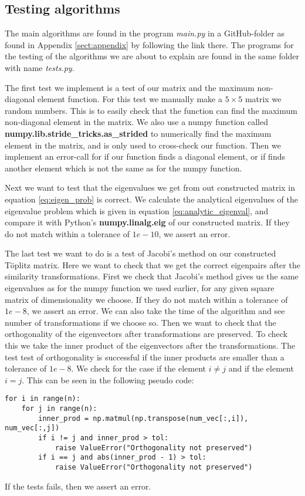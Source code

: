 \documentclass[12pt,a4paper,english]{article}
\begin{document}
\subsection{Testing algorithms}
\label{sect:testing}
The main algorithms are found in the program \textit{main.py} in a GitHub-folder as found in Appendix \ref{sect:appendix} by following the link there. The programs for the testing of the algorithms we are about to explain are found in the same folder with name \textit{tests.py}.

The first test we implement is a test of our matrix and the maximum non-diagonal element function. For this test we manually make a $5\times5$ matrix we random numbers. This is to easily check that the function can find the maximum non-diagonal element in the matrix. We also use a numpy function called \textbf{numpy.lib.stride\_tricks.as\_strided} to numerically find the maximum element in the matrix, and is only used to cross-check our function. Then we implement an error-call for if our function finds a diagonal element, or if finds another element which is not the same as for the numpy function.

Next we want to test that the eigenvalues we get from out constructed matrix in equation \ref{eq:eigen_prob} is correct. We calculate the analytical eigenvalues of the eigenvalue problem which is given in equation \ref{eq:analytic_eigenval}, and compare it with Python's \textbf{numpy.linalg.eig} of our constructed matrix. If they do not match within a tolerance of $1e-10$, we assert an error.

The last test we want to do is a test of Jacobi's method on our constructed Töplitz matrix. Here we want to check that we get the correct eigenpairs after the similarity transformations. First we check that Jacobi's method gives us the same eigenvalues as for the numpy function we used earlier, for any given square matrix of dimensionality we choose. If they do not match within a tolerance of $1e-8$, we assert an error. We can also take the time of the algorithm and see number of transformations if we choose so. Then we want to check that the orthogonality of the eigenvectors after transformations are preserved. To check this we take the inner product of the eigenvectors after the transformations. The test test of orthogonality is successful if the inner products are smaller than a tolerance of $1e-8$. We check for the case if the element $i\neq j$ and if the element $i=j$. This can be seen in the following pseudo code:
\begin{lstlisting}
for i in range(n):
	for j in range(n):
		inner_prod = np.matmul(np.transpose(num_vec[:,i]), num_vec[:,j])
		if i != j and inner_prod > tol:
			raise ValueError("Orthogonality not preserved")
		if i == j and abs(inner_prod - 1) > tol:
			raise ValueError("Orthogonality not preserved")
\end{lstlisting} 
If the tests fails, then we assert an error.
\end{document}
